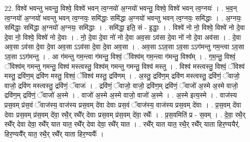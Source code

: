 \documentclass[17pt]{extarticle}
\begin{document}
22. विश्वे॑ भवन्तु भवन्तु॒ विश्वे॒ विश्वे॑ भवन् त्व॒ग्नयो॑ अ॒ग्नयो॑ भवन्तु॒ विश्वे॒ विश्वे॑ भवन् त्व॒ग्नयः॑ । . भ॒व॒न् त्व॒ग्नयो॑ अ॒ग्नयो॑ भवन्तु भवन् त्व॒ग्नयः॒ समि॑द्धाः॒ समि॑द्धा अ॒ग्नयो॑ भवन्तु भवन् त्व॒ग्नयः॒ समि॑द्धाः । . अ॒ग्नयः॒ समि॑द्धाः॒ समि॑द्धा अ॒ग्नयो॑ अ॒ग्नयः॒ समि॑द्धाः । . समि॑द्धा॒ इति॒ सं - इ॒द्धाः॒ । . विश्वे॑ नो नो॒ विश्वे॒ विश्वे॑ नो दे॒वा दे॒वा नो॒ विश्वे॒ विश्वे॑ नो दे॒वाः । . नो॒ दे॒वा दे॒वा नो॑ नो दे॒वा अव॒सा ऽव॑सा दे॒वा नो॑ नो दे॒वा अव॑सा । . दे॒वा अव॒सा ऽव॑सा दे॒वा दे॒वा अव॒सा ऽऽव॑सा दे॒वा दे॒वा अव॒सा । . अव॒सा ऽऽव॒सा ऽव॒सा ऽऽग॑मन्तु गम॒न्त्वा ऽव॒सा ऽव॒सा ऽऽग॑मन्तु । . आ ग॑मन्तु गम॒न्त्वा ग॑मन्तु॒ विश्वं॒ ॅविश्व॑म् गम॒न्त्वा ग॑मन्तु॒ विश्व᳚म् । . ग॒म॒न्तु॒ विश्वं॒ ॅविश्व॑म् गमन्तु गमन्तु॒ विश्व॑ मस्त्वस्तु॒ विश्व॑म् गमन्तु गमन्तु॒ विश्व॑ मस्तु । . विश्व॑ मस्त्वस्तु॒ विश्वं॒ ॅविश्व॑ मस्तु॒ द्रवि॑ण॒म् द्रवि॑ण मस्तु॒ विश्वं॒ ॅविश्व॑ मस्तु॒ द्रवि॑णम् । . अ॒स्तु॒ द्रवि॑ण॒म् द्रवि॑ण मस्त्वस्तु॒ द्रवि॑णं॒ ॅवाजो॒ वाजो॒ द्रवि॑ण मस्त्वस्तु॒ द्रवि॑णं॒ ॅवाजः॑ । . द्रवि॑णं॒ ॅवाजो॒ वाजो॒ द्रवि॑ण॒म् द्रवि॑णं॒ ॅवाजो॑ अ॒स्मे अ॒स्मे वाजो॒ द्रवि॑ण॒म् द्रवि॑णं॒ ॅवाजो॑ अ॒स्मे । . वाजो॑ अ॒स्मे अ॒स्मे वाजो॒ वाजो॑ अ॒स्मे । . अ॒स्मे इत्य॒स्मे । . वाज॑स्य प्रस॒वम् प्र॑स॒वं ॅवाज॑स्य॒ वाज॑स्य प्रस॒वम् दे॑वा देवाः प्रस॒वं ॅवाज॑स्य॒ वाज॑स्य प्रस॒वम् दे॑वाः । . प्र॒स॒वम् दे॑वा देवाः प्रस॒वम् प्र॑स॒वम् दे॑वा॒ रथै॒र् रथै᳚र् देवाः प्रस॒वम् प्र॑स॒वम् दे॑वा॒ रथैः᳚ । . प्र॒स॒वमिति॑ प्र - स॒वम् । . दे॒वा॒ रथै॒र् रथै᳚र् देवा देवा॒ रथै᳚र् यात यात॒ रथै᳚र् देवा देवा॒ रथै᳚र् यात । . रथै᳚र् यात यात॒ रथै॒र् रथै᳚र् याता हिर॒ण्ययैर्॑. हिर॒ण्ययै᳚र् यात॒ रथै॒र् रथै᳚र् याता हिर॒ण्ययैः᳚ । \newline
\end{document}

